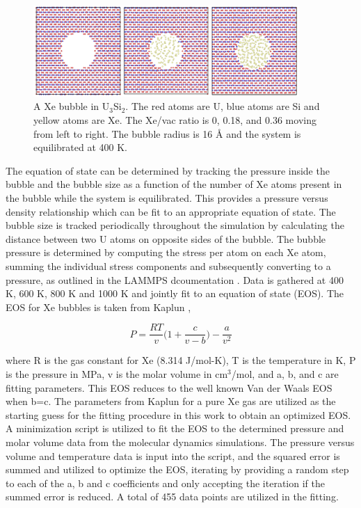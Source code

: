 \documentclass[review]{elsarticle}
\begin{document}
\begin{figure}[hbt]
	\centering
	\includegraphics[width=0.9\textwidth]{bub_ex4.png}
 \caption{A Xe bubble in U$_3$Si$_2$. The red atoms are U, blue atoms are Si and yellow atoms are Xe. The Xe/vac ratio is 0, 0.18, and 0.36 moving from left to right. The bubble radius is 16 {\AA} and the system is equilibrated at 400 K.}\label{fig:bub}
\end{figure}

The equation of state can be determined by tracking the pressure inside the bubble and the bubble size as a function of the number of Xe atoms present in the bubble while the system is equilibrated. This provides a pressure versus density relationship which can be fit to an appropriate equation of state. The bubble size is tracked periodically throughout the simulation by calculating the distance between two U atoms on opposite sides of the bubble. The bubble pressure is determined by computing the stress per atom on each Xe atom, summing the individual stress components and subsequently converting to a pressure, as outlined in the LAMMPS dcoumentation \cite{plimpton1995}. Data is gathered at 400 K, 600 K, 800 K and 1000 K and jointly fit to an equation of state (EOS). The EOS for Xe bubbles is taken from Kaplun \cite{kaplun2003}, 

\begin{equation}
\label{eq:EOS}
P=\frac{RT}{v}\bigg( 1+\frac{c}{v-b}\bigg)-\frac{a}{v^2}
\end{equation}
				
where R is the gas constant for Xe (8.314 J/mol-K\cite{kaplun2003}), T is the temperature in K, P is the pressure in MPa, v is the molar volume in cm$^3$/mol, and a, b, and c are fitting parameters. This EOS reduces to the well known Van der Waals EOS when b=c. The parameters from Kaplun \cite{kaplun2003} for a pure Xe gas are utilized as the starting guess for the fitting procedure in this work to obtain an optimized EOS. A minimization script is utilized to fit the EOS to the determined pressure and molar volume data from the molecular dynamics simulations. The pressure versus volume and temperature data is input into the script, and the squared error is summed and utilized to optimize the EOS, iterating by providing a random step to each of the a, b and c coefficients and only accepting the iteration if the summed error is reduced. A total of 455 data points are utilized in the fitting. 
\end{document}
